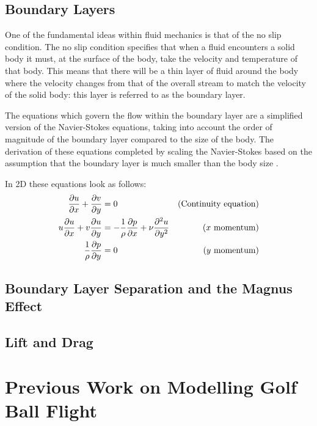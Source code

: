 \subsection{Boundary Layers}

One of the fundamental ideas within fluid mechanics is that of the no slip condition. The no slip 
condition specifies that when a fluid encounters a solid body it must, at the surface of the body,
take the velocity and temperature of that body. This means that there will be a thin layer of fluid
around the body where the velocity changes from that of the overall stream to match the velocity of
the solid body: this layer is referred to as the boundary layer.

The equations which govern the flow within the boundary layer are a simplified version of the
Navier-Stokes equations, taking into account the order of magnitude of the boundary layer compared to
the size of the body. The derivation of these equations completed by scaling the Navier-Stokes 
based on the assumption that the boundary layer is much smaller than the body size \citet{anderson}.

In 2D these equations look as follows:
\begin{subequations}
\begin{align}
\frac{\partial u}{\partial x} + \frac{\partial v}{\partial y} &= 0 &\text{(Continuity equation)} \\
u\frac{\partial u}{\partial x} + v\frac{\partial u}{\partial y} &= -\frac{1}{\rho} \frac{\partial p}{\partial x} +
\nu \frac{\partial^2 u}{\partial y^2} &\text{($x$ momentum)} \\
\frac{1}{\rho} \frac{\partial p}{\partial y} &= 0 &\text{($y$ momentum)}
\end{align}
\end{subequations}

\subsection{Boundary Layer Separation and the Magnus Effect}

\subsection{Lift and Drag}

\section{Previous Work on Modelling Golf Ball Flight}